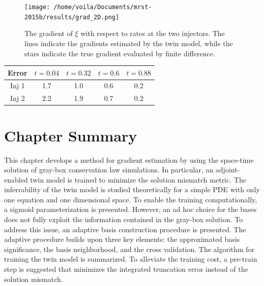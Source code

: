 \begin{figure}[htbp]
    \begin{center}
        \texttt{[image: /home/voila/Documents/mrst-2015b/results/grad\_2D.png]}
        \caption{The gradient of $\xi$ with respect to rates at the two injectors.
                 The lines indicate the gradients estimated by the twin model, while
                 the stars indicate the true gradient evaluated by finite difference.}
        \label{fig: reservoir 3D gradient}
    \end{center}
\end{figure}

\begin{center}
    \begin{tabular}{|c|c|c|c|c|}
       \hline\hline
         Error & $t=0.04$ & $t=0.32$ & $t=0.6$ & $t=0.88$\\
       \hline
       Inj 1 & 1.7  & 1.0 & 0.6 & 0.2 \\
       \hline
       Inj 2 & 2.2 &  1.9 & 0.7 & 0.2 \\
       \hline\hline
    \end{tabular}
    \label{tab: reservoir 3D grad error}
\end{center}


\section{Chapter Summary}
\label{sec: chap 2 summary}
This chapter develops a method for gradient estimation by using the space-time solution of
gray-box conservation law simulations. In particular, an adjoint-enabled twin model 
is trained to minimize the solution mismatch metric.
The inferrability of the twin model is studied theoretically for a simple PDE with only one equation
and one dimensional space. 
To enable the training computationally, a sigmoid parameterization
is presented. However, an ad hoc choice for the bases
does not fully exploit the information contained in the
gray-box solution. To address this issue,
an adaptive basis construction procedure is presented. The adaptive 
procedure  builds upon three key elements: the approximated basis significance,
the basis neighborhood, and the cross validation. The algorithm for training the twin model
is summarized. To alleviate the training cost, a pre-train step is suggested
that minimizes the integrated truncation error instead of the solution mismatch.\\

